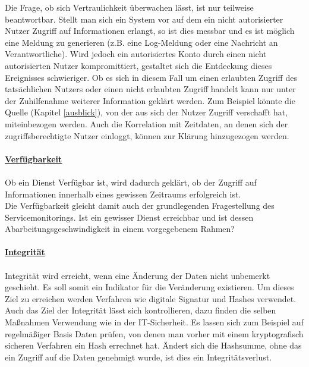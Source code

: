 Die Frage, ob sich Vertraulichkeit überwachen lässt, ist nur teilweise beantwortbar.
Stellt man sich ein System vor auf dem ein nicht autorisierter Nutzer Zugriff auf
Informationen erlangt, so ist dies messbar und es ist möglich eine Meldung 
zu generieren (z.B. eine Log-Meldung oder eine Nachricht an Verantwortliche). Wird 
jedoch ein autorisiertes Konto durch einen nicht autorisierten Nutzer kompromittiert,
gestaltet sich die Entdeckung dieses Ereignisses schwieriger. Ob es sich in diesem Fall 
um einen erlaubten Zugriff des tatsächlichen Nutzers oder einen nicht erlaubten Zugriff
handelt kann nur unter der Zuhilfenahme weiterer Information geklärt werden.
Zum Beispiel könnte die Quelle (Kapitel \ref{ausblick}), von der aus sich der Nutzer 
Zugriff verschafft hat, miteinbezogen werden. Auch die Korrelation mit Zeitdaten, an 
denen sich der zugriffsberechtigte Nutzer einloggt, können zur Klärung hinzugezogen 
werden.\\\\

\underline{\textbf{Verfügbarkeit}}\\\\
Ob ein Dienst Verfügbar ist, wird dadurch geklärt, ob der Zugriff auf Informationen
innerhalb eines gewissen Zeitraums erfolgreich ist.\\

Die Verfügbarkeit gleicht damit auch der grundlegenden Fragestellung des 
Servicemonitorings. Ist ein gewisser Dienst erreichbar und ist dessen 
Abarbeitungsgeschwindigkeit in einem vorgegebenem Rahmen?\\\\
\newpage
\underline{\textbf{Integrität}}\\\\
Integrität wird erreicht, wenn eine Änderung der Daten nicht unbemerkt geschieht. Es soll 
somit ein Indikator für die Veränderung existieren. Um dieses Ziel zu erreichen werden
Verfahren wie digitale Signatur und Hashes verwendet.\\

Auch das Ziel der Integrität lässt sich kontrollieren, dazu finden die selben Maßnahmen 
Verwendung wie in der IT-Sicherheit. Es lassen sich zum Beispiel auf regelmäßiger Basis 
Daten prüfen, von denen man vorher mit einem kryptografisch sicheren Verfahren ein Hash 
errechnet hat. Ändert sich die Hashsumme, ohne das ein Zugriff auf die Daten genehmigt 
wurde, ist dies ein Integritätsverlust.\\

